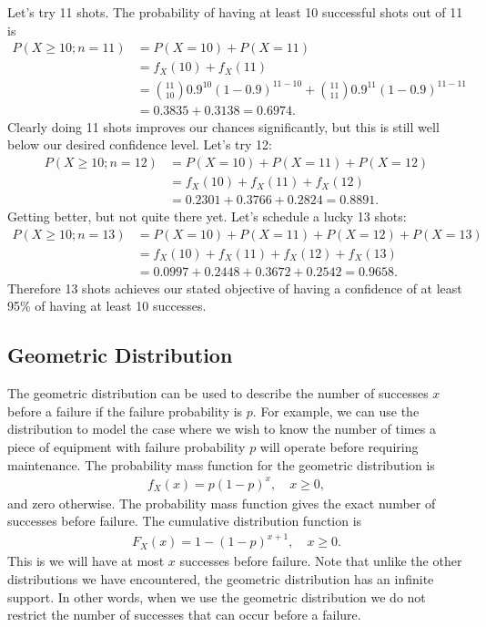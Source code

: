 Let's try 11 shots. The probability of having at least 10 successful shots out of 11 is
\begin{align}
  P(X \ge 10 ; n = 11) 
              &= P(X = 10) + P(X = 11) \nonumber \\
              &= f_X(10) + f_X(11) \nonumber \\
              &= \binom{11}{10} 0.9^{10} ( 1 - 0.9 )^{11-10} + \binom{11}{11} 0.9^11 ( 1 - 0.9 )^{11-11} \nonumber \\
              &= 0.3835  +  0.3138 =   0.6974 .
\end{align}
Clearly doing 11 shots improves our chances significantly, but this is still well below our desired confidence level. Let's try 12:
\begin{align}
  P(X \ge 10 ; n = 12 ) &= P(X = 10) + P(X = 11) + P(X = 12) \nonumber \\
                        &= f_X(10) + f_X(11) + f_X(12) \nonumber \\
                        &= 0.2301 + 0.3766 + 0.2824 =  0.8891 .
\end{align}
Getting better, but not quite there yet. Let's schedule a lucky 13 shots:
\begin{align}
  P(X \ge 10 ; n = 13) 
    &= P(X = 10) + P(X = 11) + P(X = 12) + P(X = 13) \nonumber \\
    &= f_X(10) + f_X(11) + f_X(12) + f_X(13) \nonumber \\
    &= 0.0997 + 0.2448 + 0.3672  + 0.2542    =  0.9658  .
\end{align}
Therefore 13 shots achieves our stated objective of having a confidence of at least 95\% of having at least 10 successes.


\subsection{Geometric Distribution}

The geometric distribution can be used to describe the number of successes $x$ before a failure if the failure probability is $p$. For example, we can use the distribution to model the case where we wish to know the number of times a piece of equipment with failure probability $p$ will operate before requiring maintenance. The probability mass function for the geometric distribution is
\begin{align}
  f_X(x) = p ( 1 - p )^x, \quad x \ge 0,
\end{align}
and zero otherwise. The probability mass function gives the exact number of successes before failure. The cumulative distribution function is
\begin{align}
  F_X(x) = 1 - ( 1 - p )^{x+1}, \quad x \ge 0 . 
\end{align}
This is we will have at most $x$ successes before failure. Note that unlike the other distributions we have encountered, the geometric distribution has an infinite support. In other words, when we use the geometric distribution we do not restrict the number of successes that can occur before a failure.

